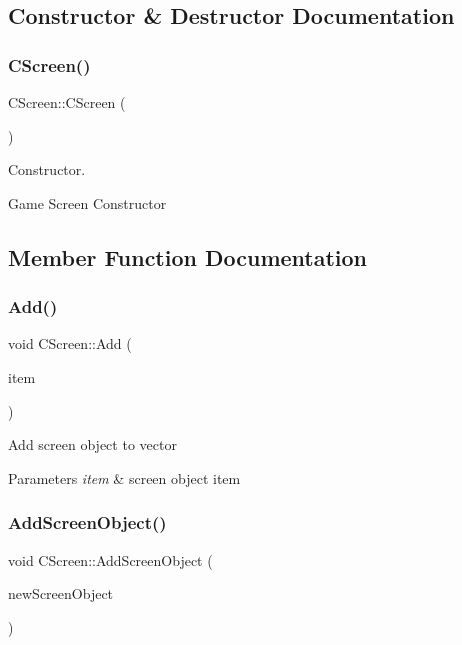\subsection{Constructor \& Destructor Documentation}
\mbox{\label{class_c_screen_ac2dfca02f82f6f2943ee601952bf5915}} 
\subsubsection{\texorpdfstring{CScreen()}{CScreen()}}
{\footnotesize\ttfamily C\+Screen\+::\+C\+Screen (\begin{DoxyParamCaption}{ }\end{DoxyParamCaption})}



Constructor. 

Game Screen Constructor 

\subsection{Member Function Documentation}
\mbox{\label{class_c_screen_a773492fc00dd2816841043f5b6b97107}} 
\subsubsection{\texorpdfstring{Add()}{Add()}}
{\footnotesize\ttfamily void C\+Screen\+::\+Add (\begin{DoxyParamCaption}\item[{std\+::shared\+\_\+ptr$<$ \mbox{\hyperlink{class_c_screen_object}{C\+Screen\+Object}} $>$}]{item }\end{DoxyParamCaption})}

Add screen object to vector 
\begin{DoxyParams}{Parameters}
{\em item} & screen object item \\
\hline
\end{DoxyParams}
\mbox{\label{class_c_screen_a12ada444c474754438b99d1a39bb5c70}} 
\subsubsection{\texorpdfstring{AddScreenObject()}{AddScreenObject()}}
{\footnotesize\ttfamily void C\+Screen\+::\+Add\+Screen\+Object (\begin{DoxyParamCaption}\item[{std\+::shared\+\_\+ptr$<$ \mbox{\hyperlink{class_c_screen_object}{C\+Screen\+Object}} $>$}]{new\+Screen\+Object }\end{DoxyParamCaption})}

